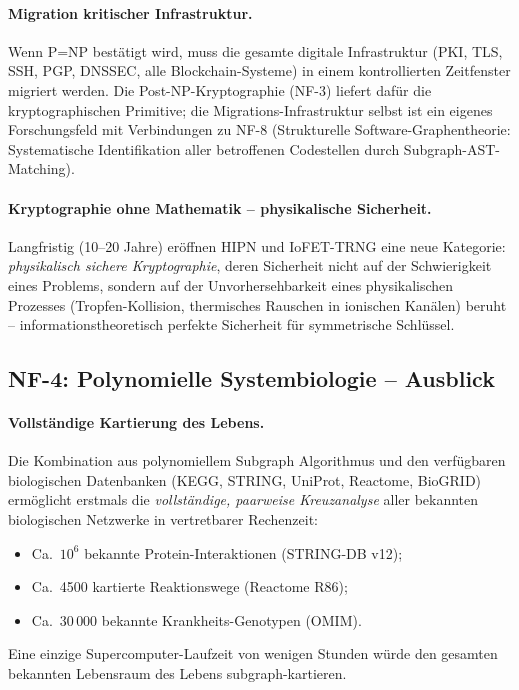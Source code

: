 ﻿\documentclass[a4paper,12pt]{scrreprt}
\theoremstyle{definition}
\begin{document}
\paragraph{Migration kritischer Infrastruktur.}
Wenn P=NP bestätigt wird, muss die gesamte digitale Infrastruktur
(PKI, TLS, SSH, PGP, DNSSEC, alle Blockchain-Systeme) in einem
kontrollierten Zeitfenster migriert werden. Die Post-NP-Kryptographie
(NF-3) liefert dafür die kryptographischen Primitive; die
Migrations-Infrastruktur selbst ist ein eigenes Forschungsfeld
mit Verbindungen zu NF-8 (Strukturelle Software-Graphentheorie:
Systematische Identifikation aller betroffenen Codestellen durch
Subgraph-AST-Matching).

\paragraph{Kryptographie ohne Mathematik -- physikalische Sicherheit.}
Langfristig (10--20 Jahre) eröffnen HIPN und IoFET-TRNG eine neue
Kategorie: \emph{physikalisch sichere Kryptographie}, deren Sicherheit
nicht auf der Schwierigkeit eines Problems, sondern auf der
Unvorhersehbarkeit eines physikalischen Prozesses (Tropfen-Kollision,
thermisches Rauschen in ionischen Kanälen) beruht -- informationstheoretisch
perfekte Sicherheit für symmetrische Schlüssel.

\subsection*{NF-4: Polynomielle Systembiologie -- Ausblick}

\paragraph{Vollständige Kartierung des Lebens.}
Die Kombination aus polynomiellem Subgraph Algorithmus und den
verfügbaren biologischen Datenbanken (KEGG, STRING, UniProt,
Reactome, BioGRID) ermöglicht erstmals die \emph{vollständige,
paarweise Kreuzanalyse} aller bekannten biologischen Netzwerke
in vertretbarer Rechenzeit:
\begin{itemize}
  \item Ca.\ $10^6$ bekannte Protein-Interaktionen (STRING-DB v12);
  \item Ca.\ 4500 kartierte Reaktionswege (Reactome R86);
  \item Ca.\ $30\,000$ bekannte Krankheits-Genotypen (OMIM).
\end{itemize}
Eine einzige Supercomputer-Laufzeit von wenigen Stunden würde
den gesamten bekannten Lebensraum des Lebens subgraph-kartieren.
\end{document}
